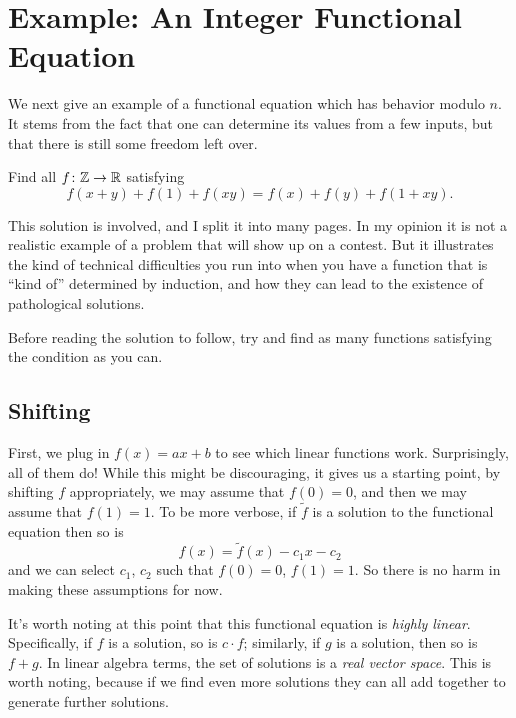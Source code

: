 \documentclass[11pt]{scrartcl}
\begin{document}
\section{Example: An Integer Functional Equation}
We next give an example of a functional equation which has behavior modulo $n$.
It stems from the fact that one can determine its values from a few inputs,
but that there is still some freedom left over.
\begin{example}
  \label{ex:gabriel}
  Find all $f \colon \mathbb Z \to \mathbb R$ satisfying
  \[f (x + y) + f (1) + f (xy) = f (x) + f (y) + f (1 + xy). \]
\end{example}

This solution is involved, and I split it into many pages.
In my opinion it is not a realistic example of a problem that will show up on a contest.
But it illustrates the kind of technical difficulties you run into
when you have a function that is ``kind of'' determined by induction,
and how they can lead to the existence of pathological solutions.

\begin{exercise}
  Before reading the solution to follow,
  try and find as many functions satisfying the condition as you can.
  \label{exer:foresight}
\end{exercise}

\subsection{Shifting}
First, we plug in $f(x) = ax+b$ to see which linear functions work.
Surprisingly, all of them do!
While this might be discouraging, it gives us a starting point,
by shifting $f$ appropriately, we may assume that $f(0) = 0$,
and then we may assume that $f(1) = 1$.
To be more verbose, if $\tilde f$ is a solution to the functional equation then so is
\[
  f(x) = \tilde f(x) - c_1 x - c_2
\]
and we can select $c_1$, $c_2$ such that $f(0) = 0$, $f(1) = 1$.
So there is no harm in making these assumptions for now.

It's worth noting at this point that this functional equation is \emph{highly linear}.
Specifically, if $f$ is a solution, so is $c \cdot f$;
similarly, if $g$ is a solution, then so is $f+g$.
In linear algebra terms, the set of solutions is a \emph{real vector space}.
This is worth noting, because if we find even more solutions they can all add
together to generate further solutions.
\end{document}
